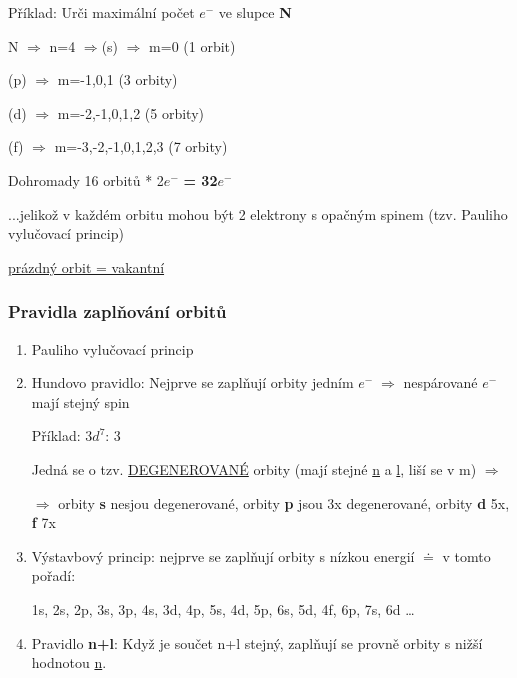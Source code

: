 \documentclass{article}
\begin{document}
    \newpage
    Příklad: Urči maximální počet $e^-$ ve slupce \textbf{N}

    \smallskip
    \TabPositions{0em, 7em}
    N $\Rightarrow$ n=4 $\Rightarrow$(s) $\Rightarrow$ m=0 (1 orbit)

        (p) $\Rightarrow$ m=-1,0,1 (3 orbity)
    
        (d) $\Rightarrow$ m=-2,-1,0,1,2 (5 orbity)
    
        (f) $\Rightarrow$ m=-3,-2,-1,0,1,2,3 (7 orbity)

    \medskip
    Dohromady 16 orbitů * 2$e^-$ \textbf{= 32$e^-$}

    ...jelikož v každém orbitu mohou být 2 elektrony s opačným spinem (tzv. Pauliho vylučovací princip)

    \bigskip
    \fbox{\;\;} \underline{prázdný orbit = vakantní}

    \subsubsection{Pravidla zaplňování orbitů}
    \begin{enumerate}
        \item Pauliho vylučovací princip
        \item Hundovo pravidlo: Nejprve se zaplňují orbity jedním $e^- \; \Rightarrow$ nespárované $e^-$ mají stejný spin
        
        Příklad: $3d^7$: 3 \fbox{$\downarrow\textcolor{magenta}{\uparrow}$}\fbox{$\downarrow\textcolor{magenta}{\uparrow}$}\fbox{$\downarrow\textcolor{magenta}{.}$}\fbox{$\downarrow\textcolor{magenta}{.}$}\fbox{$\downarrow\textcolor{magenta}{.}$}
        
        Jedná se o tzv. \underline{DEGENEROVANÉ} orbity (mají stejné \underline{n} a \underline{l}, liší se v m) $\Rightarrow$
        
        $\Rightarrow$ orbity \textbf{s} nesjou degenerované, orbity \textbf{p} jsou 3x degenerované, orbity \textbf{d} 5x, \textbf{f} 7x
        \item Výstavbový princip: nejprve se zaplňují orbity s nízkou energií $\doteq$ v tomto pořadí:
        
        1s, 2s, 2p, 3s, 3p, 4s, 3d, 4p, 5s, 4d, 5p, 6s, 5d, 4f, 6p, 7s, 6d \dots
        \item Pravidlo \textbf{n+l}: Když je součet n+l stejný, zaplňují se provně orbity s nižší hodnotou \underline{n}.
    \end{enumerate}
\end{document}
